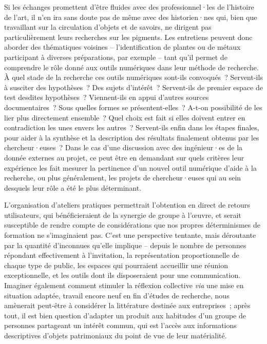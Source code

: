 \documentclass[a4paper,12pt, twoside]{book}
\begin{document}
Si les échanges promettent d’être fluides avec des professionnel·les de l’histoire de l’art, il n’en ira sans doute pas de même avec des historien·nes qui, bien que travaillant sur la circulation d’objets et de savoirs, ne dirigent pas particulièrement leurs recherches sur les pigments. Les entretiens peuvent donc aborder des thématiques voisines – l’identification de plantes ou de métaux participant à diverses préparations, par exemple – tant qu’il permet de comprendre le rôle donné aux outils numériques dans leur méthode de recherche. À quel stade de la recherche ces outils numériques sont-ils convoqués~? Servent-ils à susciter des hypothèses~? Des sujets d’intérêt~? Servent-ils de premier espace de test desdites hypothèses~? Viennent-ils en appui d’autres sources documentaires~? Sous quelles formes se présentent-elles~? A-t-on possibilité de les lier plus directement ensemble~? Quel choix est fait si elles doivent entrer en contradiction les unes envers les autres~? Servent-ils enfin dans les étapes finales, pour aider à la synthèse et la description des résultats finalement obtenus par les chercheur·euses~? Dans le cas d’une discussion avec des ingénieur·es de la donnée externes au projet, ce peut être en demandant sur quels critères leur expérience les fait mesurer la pertinence d’un nouvel outil numérique d’aide à la recherche, ou plus généralement, les projets de chercheur·euses qui au sein desquels leur rôle a été le plus déterminant.

L’organisation d’ateliers pratiques permettrait l’obtention en direct de retours utilisateurs, qui bénéficieraient de la synergie de groupe à l’œuvre, et serait susceptible de rendre compte de considérations que nos propres déterminismes de formation ne s’imaginaient pas. C’est une perspective tentante, mais déroutante par la quantité d’inconnues qu’elle implique – depuis le nombre de personnes répondant effectivement à l’invitation, la représentation proportionnelle de chaque type de public, les espaces qui pourraient accueillir une réunion exceptionnelle, et les outils dont ils disposeraient pour une communication. Imaginer également comment stimuler la réflexion collective \textit{via} une mise en situation adaptée, travail encore neuf en fin d’études de recherche, nous amènerait peut-être à considérer la littérature destinée aux entreprises~; après tout, il est bien question d’adapter un produit aux habitudes d’un groupe de personnes partageant un intérêt commun, qui est l’accès aux informations descriptives d’objets patrimoniaux du point de vue de leur matérialité.
\end{document}
